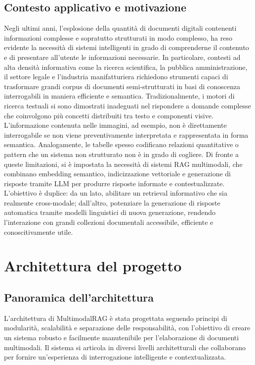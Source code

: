 \subsection{Contesto applicativo e motivazione}
Negli ultimi anni, l'esplosione della quantità di documenti digitali contenenti informazioni complesse e sopratutto strutturati in modo complesso, ha reso evidente la necessità di sistemi intelligenti in grado di comprenderne il contenuto e di presentare all'utente le informazioni necessarie. In particolare, contesti ad alta densità informativa come la ricerca scientifica, la pubblica amministrazione, il settore legale e l’industria manifatturiera richiedono strumenti capaci di trasformare grandi corpus di documenti semi-strutturati in basi di conoscenza interrogabili in maniera efficiente e semantica.
Tradizionalmente, i motori di ricerca testuali si sono dimostrati inadeguati nel rispondere a domande complesse che coinvolgono più concetti distribuiti tra testo e componenti visive. L'informazione contenuta nelle immagini, ad esempio, non è direttamente interrogabile se non viene preventivamente interpretata e rappresentata in forma semantica. Analogamente, le tabelle spesso codificano relazioni quantitative o pattern che un sistema non strutturato non è in grado di cogliere. Di fronte a queste limitazioni, si è impostata la necessità di sistemi RAG  multimodali, che combinano embedding semantico, indicizzazione vettoriale e generazione di risposte tramite LLM per produrre risposte informate e contestualizzate. L’obiettivo è duplice: da un lato, abilitare un retrieval informativo che sia realmente cross-modale; dall’altro, potenziare la generazione di risposte automatica tramite modelli linguistici di nuova generazione, rendendo l’interazione con grandi collezioni documentali accessibile, efficiente e conoscitivamente utile.



\section{Architettura del progetto}

\subsection{Panoramica dell'architettura}
L'architettura di MultimodalRAG è stata progettata seguendo principi di modularità, scalabilità e separazione delle responsabilità, con l'obiettivo di creare un sistema robusto e facilmente manutenibile per l'elaborazione di documenti multimodali. Il sistema si articola in diversi livelli architetturali che collaborano per fornire un'esperienza di interrogazione intelligente e contextualizzata.

